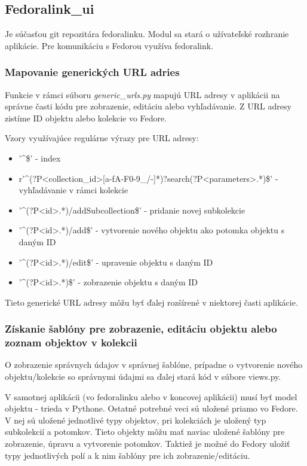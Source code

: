 \documentclass[thesis=M,slovak]{FITthesis}[2013/05/06]
\begin{document}
\subsection{Fedoralink\_ui}
Je súčasťou git repozitára fedoralinku. Modul sa stará o užívateľské rozhranie aplikácie. Pre komunikáciu s Fedorou využíva fedoralink.

\subsubsection{Mapovanie generických URL adries}
Funkcie v rámci súboru {\em generic\_urls.py} mapujú URL adresy v aplikácii na správne časti kódu pre zobrazenie, editáciu alebo vyhľadávanie. Z URL adresy zistíme ID objektu alebo kolekcie vo Fedore.

Vzory využívajúce regulárne výrazy pre URL adresy:
\begin{itemize}
	\item '\textasciicircum\$' - index
	\item r'\textasciicircum(?P<collection\_id>[a-fA-F0-9\_/-]*)?search(?P<parameters>.*)\$' - vyhľadávanie v rámci kolekcie
	\item '\textasciicircum(?P<id>.*)/addSubcollection\$' - pridanie novej subkolekcie
	\item '\textasciicircum(?P<id>.*)/add\$' - vytvorenie nového objektu ako potomka objektu s daným ID
	\item '\textasciicircum(?P<id>.*)/edit\$' - upravenie objektu s daným ID
	\item '\textasciicircum(?P<id>.*)\$' - zobrazenie objektu s daným ID
\end{itemize}

Tieto generické URL adresy môžu byť ďalej rozšírené v niektorej časti aplikácie.

\subsubsection{Získanie šablóny pre zobrazenie, editáciu objektu alebo zoznam objektov v kolekcii}
O zobrazenie správnych údajov v správnej šablóne, prípadne o vytvorenie nového objektu/kolekcie so správnymi údajmi sa ďalej stará kód v súbore views.py.

V samotnej aplikácii (vo fedoralinku alebo v koncovej aplikácii) musí byť model objektu - trieda v Pythone. Ostatné potrebné veci sú uložené priamo vo Fedore. V nej sú uložené jednotlivé typy objektov, pri kolekciách je uložený typ subkolekcií a potomkov. Tieto objekty môžu mať naviac uložené šablóny pre zobrazenie, úpravu a vytvorenie potomkov. Taktiež je možné do Fedory uložiť typy jednotlivých polí a k nim šablóny pre ich zobrazenie/editáciu.
\end{document}
